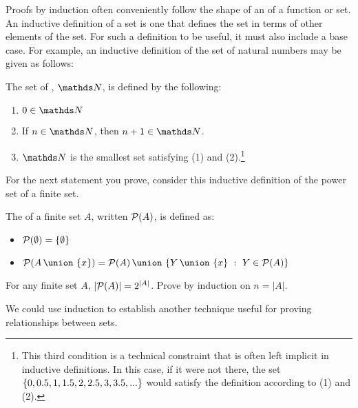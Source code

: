 \begin{discussion}
Proofs by induction often conveniently follow the shape of an  of a function or set. An inductive definition of a set is one that defines the set in terms of other elements of the set. For such a definition to be useful, it must also include a base case. For example, an inductive definition of the set of natural numbers may be given as follows:
\end{discussion}

\begin{defn}
The set of , $\naturals$, is defined by the following:
\begin{enumerate}
\item $0 \in \naturals$
\item If $n \in \naturals$, then $n+1 \in \naturals$.
\item $\naturals$ is the smallest set satisfying (1) and (2).\footnote{This third condition is a technical constraint that is often left implicit in inductive definitions. In this case, if it were not there, the set $\left\lbrace 0, 0.5, 1, 1.5, 2, 2.5, 3, 3.5, ... \right\rbrace$ would satisfy the definition according to (1) and (2).}
\end{enumerate}
\end{defn}

\begin{discussion}
For the next statement you prove, consider this inductive definition of the power set of a finite set.
\end{discussion}

\begin{defn}
The  of a finite set $A$, written $\mathcal{P}(A)$, is defined as:
\begin{itemize}
\item $\mathcal{P}(\emptyset) = \left\lbrace \emptyset \right\rbrace$
\item $\powerset{\setunion{A}{\setdef x}} = \setunion{\powerset{A}}{ \setbuild{\setunion{Y}{\setdef{x}}}{Y \in \powerset{A}}  }$
\end{itemize}
\end{defn}

\begin{stmt3}
For any finite set $A$, $|\mathcal{P}(A)| = 2^{|A|}$. 
\hint Prove by induction on $n = |A|$.
\end{stmt3}

\begin{discussion}
We could use induction to establish another technique useful for proving relationships between sets.
\end{discussion}

